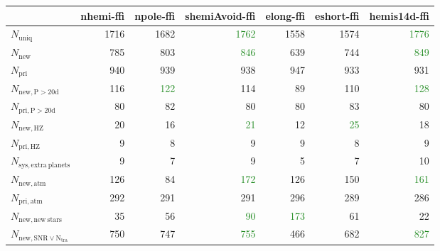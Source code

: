 \begin{tabular}{lrrrrrr}
\toprule
{} &  nhemi-ffi &  npole-ffi &  shemiAvoid-ffi &  elong-ffi &  eshort-ffi &  hemis14d-ffi \\
\midrule
$N_{\mathrm{uniq}}$                &       1716 &       1682 &            \textcolor{ForestGreen}{1762} &       1558 &        1574 &          \textcolor{ForestGreen}{1776} \\
$N_{\mathrm{new}}$                 &        785 &        803 &             \textcolor{ForestGreen}{846} &        639 &         744 &           \textcolor{ForestGreen}{849} \\
$N_{\mathrm{pri}}$                 &        940 &        939 &             938 &        947 &         933 &           931 \\
$N_{\mathrm{new,P>20d}}$           &        116 &        \textcolor{ForestGreen}{122} &             114 &         89 &         110 &           \textcolor{ForestGreen}{128} \\
$N_{\mathrm{pri,P>20d}}$           &         80 &         82 &              80 &         80 &          83 &            80 \\
$N_{\mathrm{new,HZ}}$              &         20 &         16 &              \textcolor{ForestGreen}{21} &         12 &          \textcolor{ForestGreen}{25} &            18 \\
$N_{\mathrm{pri,HZ}}$              &          9 &          8 &               9 &          9 &           8 &             9 \\
$N_{\mathrm{sys,extra\ planets}}$  &          9 &          7 &               9 &          5 &           7 &            10 \\
$N_{\mathrm{new,atm}}$             &        126 &         84 &             \textcolor{ForestGreen}{172} &        126 &         150 &           \textcolor{ForestGreen}{161} \\
$N_{\mathrm{pri,atm}}$             &        292 &        291 &             291 &        296 &         289 &           286 \\
$N_{\mathrm{new,new\ stars}}$      &         35 &         56 &              \textcolor{ForestGreen}{90} &        \textcolor{ForestGreen}{173} &          61 &            22 \\
$N_{\mathrm{new,SNR\lor N_{tra}}}$ &        750 &        747 &             \textcolor{ForestGreen}{755} &        466 &         682 &           \textcolor{ForestGreen}{827} \\
\bottomrule
\end{tabular}
